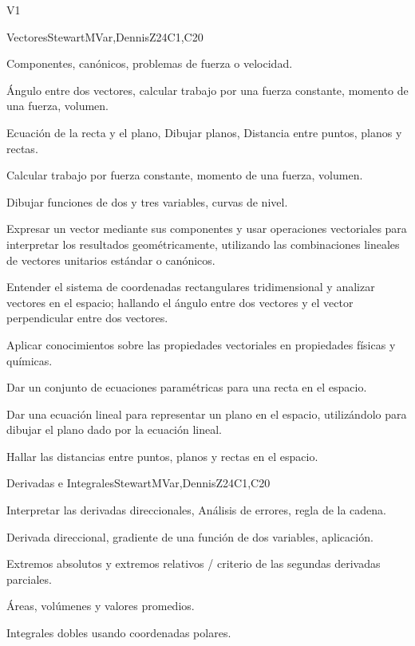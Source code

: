 \begin{syllabus}
\begin{competences}{V1}
    \item {}
    \item {}
\end{competences}

\begin{unit}{Vectores}{}{StewartMVar,DennisZ}{24}{C1,C20}
  \begin{topics}      
  \item Componentes, canónicos, problemas de fuerza o velocidad.
  \item Ángulo entre dos vectores, calcular trabajo por una fuerza constante, momento de una fuerza, volumen.
  \item Ecuación de la recta y el plano, Dibujar planos, Distancia entre puntos, planos y rectas.
  \item Calcular trabajo por fuerza constante, momento de una fuerza, volumen.
  \item Dibujar funciones de dos y tres variables, curvas de nivel.
    \end{topics}

  \begin{learningoutcomes}
  \item Expresar un vector mediante sus componentes y usar operaciones vectoriales para interpretar los resultados geométricamente, utilizando las combinaciones lineales de vectores unitarios estándar o canónicos.
  \item Entender el sistema de coordenadas rectangulares tridimensional y analizar vectores en el espacio; hallando el ángulo entre dos vectores y el vector perpendicular entre dos vectores.
  \item Aplicar conocimientos sobre las propiedades vectoriales en propiedades físicas y químicas.
  \item Dar un conjunto de ecuaciones paramétricas para una recta en el espacio.
  \item Dar una ecuación lineal para representar un plano en el espacio, utilizándolo para dibujar el plano dado por la ecuación lineal.
  \item Hallar las distancias entre puntos, planos y rectas en el espacio.
  \end{learningoutcomes}
\end{unit}

\begin{unit}{Derivadas e Integrales}{}{StewartMVar,DennisZ}{24}{C1,C20}
  \begin{topics}
    \item Interpretar las derivadas direccionales, Análisis de errores, regla de la cadena.
    \item Derivada direccional, gradiente de una función de dos variables, aplicación.
    \item Extremos absolutos y extremos relativos / criterio de las segundas derivadas parciales.
    \item Áreas, volúmenes y valores promedios.
    \item Integrales dobles usando coordenadas polares.
\end{topics}  


\end{unit}
\end{syllabus}

